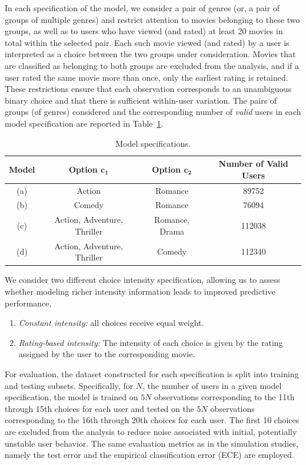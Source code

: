 \documentclass[12pt]{amsart}
\theoremstyle{plain}
\theoremstyle{remark}
\numberwithin{equation}{section}
\begin{document}
In each specification of the model, we consider a pair of genres (or, a pair of groups of multiple genres) and restrict attention to movies belonging to these two groups, as well as to users who have viewed (and rated) at least 20 movies in total within the selected pair. Each such movie viewed (and rated) by a user is interpreted as a choice between the two groups under consideration. Movies that are classified as belonging to both groups are excluded from the analysis, and if a user rated the same movie more than once, only the earliest rating is retained. These restrictions ensure that each observation corresponds to an unambiguous binary choice and that there is sufficient within-user variation. The pairs of groups (of genres) considered and the corresponding number of \emph{valid} users in each model specification are reported in Table~\ref{tab:models}. 

\begin{table}[h]
\centering
\renewcommand{\arraystretch}{0.75}
\begin{tabular}{|c|c|c|c|}
\hline
Model & {Option $\boldsymbol{c_1}$} & {Option $\boldsymbol{c_2}$} & {Number of Valid Users} \\
\hline
(a) & Action  & Romance & 89752\\
(b) & Comedy  & Romance & 76094\\
(c) & Action, Adventure, Thriller & Romance, Drama & 112038 \\
(d) & Action, Adventure, Thriller & Comedy & 112340 \\
\hline
\end{tabular}
\caption{Model specifications.}
\label{tab:models}
\end{table}


We consider two different choice intensity specification, allowing us to assess whether modeling richer intensity information leads to improved predictive performance, 
\begin{enumerate}[nosep]
\item \textit{Constant intensity:} all choices receive equal weight.
\item \textit{Rating-based intensity:} The intensity of each choice is given by the rating assigned by the user to the corresponding movie.
\end{enumerate}

For evaluation, the dataset constructed for each specification is split into training and testing subsets. Specifically, for $N$, the number of users in a given model specification, the model is trained on $5N$ observations corresponding to the 11th through 15th choices for each user and tested on the 
$5N$ observations corresponding to the 16th through 20th choices for each user. The first 10 choices are excluded from the analysis to reduce noise associated with initial, potentially unstable user behavior. The same evaluation metrics as in the simulation studies, namely the test error and the empirical classification error (ECE) are employed. 
\end{document}
